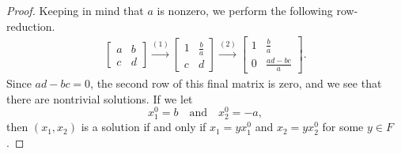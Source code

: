 \begin{enumerate}
\begin{proof}
    Keeping in mind that $a$ is nonzero, we perform the following
    row-reduction.
    \begin{gather*}
      \begin{bmatrix}
        a & b \\
        c & d
      \end{bmatrix}
      \xrightarrow{(1)}
      \begin{bmatrix}
        1 & \frac{b}a \\[3pt]
        c & d
      \end{bmatrix}
      \xrightarrow{(2)}
      \begin{bmatrix}
        1 & \frac{b}a \\[3pt]
        0 & \frac{ad - bc}a
      \end{bmatrix}.
    \end{gather*}
    Since $ad - bc = 0$, the second row of this final matrix is zero,
    and we see that there are nontrivial solutions. If we let
    \begin{equation*}
      x_1^0 = b
      \quad\text{and}\quad
      x_2^0 = -a,
    \end{equation*}
    then $(x_1,x_2)$ is a solution if and only if $x_1 = yx_1^0$ and
    $x_2 = yx_2^0$ for some $y\in F$.
  \end{proof}
\end{enumerate}
